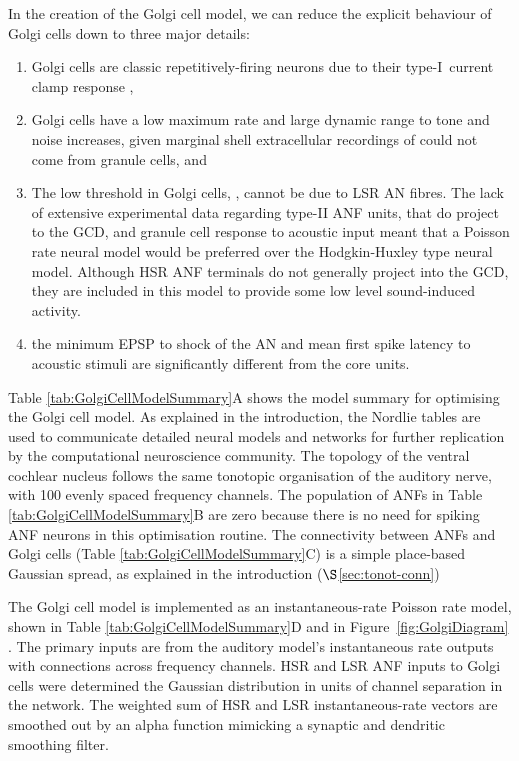  In the creation of the Golgi cell model, we can reduce the explicit behaviour
 of Golgi cells down to three major details:
 \begin{enumerate}
 \item Golgi cells are classic repetitively-firing neurons due to their
   type-I~current clamp response \citep{FerragamoGoldingEtAl:1998},
 \item Golgi cells have a low maximum rate and large dynamic range to tone and
   noise increases, given marginal shell extracellular recordings of
   \citet{GhoshalKim:1997} could not come from granule cells, and
 \item The low threshold in Golgi cells, \citet{GhoshalKim:1997}, cannot be due
   to LSR AN fibres. The lack of extensive experimental data regarding type-II
   ANF units, that do project to the GCD, and granule cell response to acoustic
   input meant that a Poisson rate neural model would be preferred over the
   Hodgkin-Huxley type neural model.  Although HSR ANF terminals do not
   generally project into the GCD, they are included in this model to provide
   some low level sound-induced activity.
 \item the minimum EPSP to shock of the AN \citep{FerragamoGoldingEtAl:1998} and
   mean first spike latency to acoustic stimuli \citep{GhoshalKim:1997} are
   significantly different from the core \VCN units.
 \end{enumerate}

 Table \ref{tab:GolgiCellModelSummary}A shows the model summary for optimising
 the Golgi cell model. As explained in the introduction, the Nordlie tables are
 used to communicate detailed neural models and networks for further replication
 by the computational neuroscience community. The topology of the ventral
 cochlear nucleus follows the same tonotopic organisation of the auditory nerve,
 with 100 evenly spaced frequency channels. The population of ANFs in Table
 \ref{tab:GolgiCellModelSummary}B are zero because there is no need for spiking
 ANF neurons in this optimisation routine.  The connectivity between ANFs and
 Golgi cells (Table \ref{tab:GolgiCellModelSummary}C) is a simple place-based
 Gaussian spread, as explained in the introduction ($\S$\ref{sec:tonot-conn})

 

 The Golgi cell model is implemented as an instantaneous-rate Poisson rate
 model, shown in Table \ref{tab:GolgiCellModelSummary}D and in
 Figure~\ref{fig:GolgiDiagram} . The primary inputs are from the auditory
 model's instantaneous rate outputs with connections across frequency
 channels. HSR and LSR ANF inputs to Golgi cells were determined the Gaussian
 distribution in units of channel separation in the network. The weighted sum of
 HSR and LSR instantaneous-rate vectors are smoothed out by an alpha function
 mimicking a synaptic and dendritic smoothing filter.

